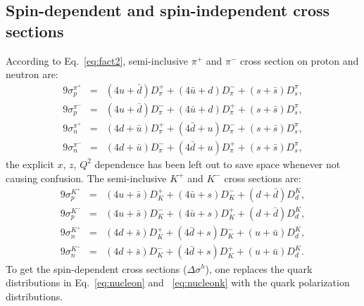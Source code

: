 \subsection{Spin-dependent and spin-independent cross sections} 
According to Eq.~\ref{eq:fact2}, semi-inclusive  $\pi^{+}$ and $\pi^{-}$ cross section
 on proton and neutron are: 
\begin{eqnarray}  
 9 \sigma_p^{\pi^+} & = & (4 u+\bar{d})D_{\pi}^+ 
 + (4 {\bar u}+ d)D_{\pi}^- + (s+\bar{s}) D_s^{\pi}, \nonumber \\ 
 9 \sigma_p^{\pi^-} & = & (4 u+\bar{d})D_{\pi}^- 
 + (4 {\bar u}+ d)D_{\pi}^+ + (s+\bar{s}) D_s^{\pi}, \nonumber \\ 
 9 \sigma_n^{\pi^+} & = & (4 d+\bar{u})D_{\pi}^+ 
 + (4 {\bar d}+ u)D_{\pi}^- + (s+\bar{s}) D_s^{\pi}, \nonumber \\ 
 9 \sigma_n^{\pi^-} & = & (4 d+\bar{u})D_{\pi}^- 
 + (4 {\bar d}+ u)D_{\pi}^+ + (s+\bar{s}) D_s^{\pi},  
\label{eq:nucleon}  
\end{eqnarray}  
the explicit $x$, $z$, $Q^2$ dependence has been left out to save space whenever
not causing confusion.  
The semi-inclusive  $K^{+}$ and $K^{-}$ cross sections are: 
\begin{eqnarray}  
 9\sigma_p^{K^+} & = & (4 u+ \bar{s})D_{K}^+ 
 + (4 {\bar u}+ s)D_{K}^- + (d +\bar{d}) D_d^{K}, \nonumber \\ 
 9\sigma_p^{K^-} & = & (4 u+ \bar{s})D_{K}^- 
 + (4 {\bar u}+ s)D_{K}^+ + (d +\bar{d}) D_d^{K}, \nonumber \\ 
 9\sigma_n^{K^+} & = & (4 d+ \bar{s})D_{K}^+ 
 + (4 {\bar d}+ s)D_{K}^- + (u +\bar{u}) D_d^{K}, \nonumber \\ 
 9\sigma_n^{K^-} & = & (4 d+ \bar{s})D_{K}^- 
 + (4 {\bar d}+ s)D_{K}^+ + (u +\bar{u}) D_d^{K}. 
\label{eq:nucleonk}  
\end{eqnarray}  
To  get the spin-dependent cross sections ($\Delta \sigma^h$), one   
replaces the quark distributions in Eq.~\ref{eq:nucleon} and ~\ref{eq:nucleonk} 
with the quark polarization distributions.


